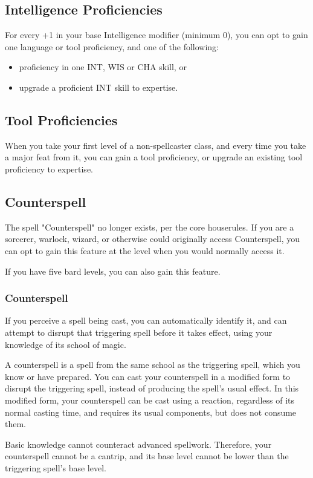 \documentclass[letterpaper,twocolumn,openany,nodeprecatedcode,bg=print]{dndbook}
\begin{document}
\subsection{Intelligence Proficiencies}
For every +1 in your base Intelligence modifier (minimum 0), 
you can opt to gain one language or tool proficiency, and one of the following:
\begin{itemize}
    \item proficiency in one INT, WIS or CHA skill, or
    \item upgrade a proficient INT skill to expertise.
\end{itemize}

\subsection{Tool Proficiencies}
When you take your first level of a non-spellcaster class, and every time you take a major feat from it, 
you can gain a tool proficiency, or upgrade an existing tool proficiency to expertise. 

\subsection{Counterspell}
\label{counterspell}
The spell "Counterspell" no longer exists, per the core houserules.
If you are a sorcerer, warlock, wizard, or otherwise could originally access Counterspell,
you can opt to gain this feature at the level when you would normally access it.

If you have five bard levels, you can also gain this feature.

\subsubsection{Counterspell}
If you perceive a spell being cast, 
you can automatically identify it, 
and can attempt to disrupt that triggering spell before it takes effect, using your knowledge of its school of magic.

A counterspell is a spell from the same school as the triggering spell, which you know or have prepared. 
You can cast your counterspell in a modified form to disrupt the triggering spell, instead of producing the spell's usual effect. 
In this modified form, your counterspell can be cast using a reaction, regardless of its normal casting time, 
and requires its usual components, but does not consume them.

Basic knowledge cannot counteract advanced spellwork. 
Therefore, your counterspell cannot be a cantrip, 
and its base level cannot be lower than the triggering spell's base level.
\end{document}
